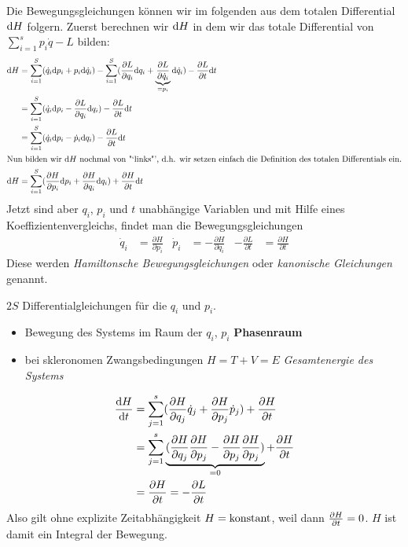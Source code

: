 Die Bewegungsgleichungen können wir im folgenden aus dem totalen Differential $\mathrm d H$ folgern.
Zuerst berechnen wir $\mathrm d H$ in dem wir das totale Differential von $\sum_{i=1}^s p_i \dot{q} - L$ bilden:
\begin{align*}
\mathrm d H &= \sum\limits_{i=1}^S (\dot q_i \mathrm d p_i + p_i \mathrm d \dot q_i) - \sum\limits_{i=1}^S (\frac{\partial L}{\partial q_i} \mathrm d q_i + \underbrace{\frac{\partial L}{\partial \dot q_i}}_{=p_i} \mathrm d \dot q_i) - \frac{\partial L}{\partial t} \mathrm d t\\
&=\sum\limits_{i=1}^S(\dot q_i \mathrm d p_i - \frac{\partial L}{\partial q_i}\mathrm d q_i) - \frac{\partial L}{\partial t}\mathrm d t\\
&=\sum\limits_{i=1}^S(\dot q_i \mathrm d p_i - \dot p_i\mathrm d q_i) - \frac{\partial L}{\partial t}\mathrm d t\\
\intertext{Nun bilden wir $\mathrm d H$ nochmal von "`links"', d.h. wir setzen einfach die Definition des totalen Differentials ein.}
\mathrm d H &= \sum\limits_{i=1}^S(\frac{\partial H}{\partial p_i}\mathrm d p_i + \frac{\partial H}{\partial q_i}\mathrm d q_i) + \frac{\partial H}{\partial t}\mathrm d t\\
\end{align*}
Jetzt sind aber $q_i$, $p_i$ und $t$ unabhängige Variablen und mit Hilfe eines Koeffizientenvergleichs, findet man die Bewegungsgleichungen
\begin{align*}
\dot q_i &= \frac{\partial H}{\partial p_i} & \dot p_i &= - \frac{\partial H}{\partial q_i} & -\frac{\partial L}{\partial t} &= \frac{\partial H}{\partial t}
\end{align*}
Diese werden \emph{Hamiltonsche Bewegungsgleichungen} oder \emph{kanonische Gleichungen} genannt.

\begin{bemerkung*}
	$2S$ Differentialgleichungen für die $q_i$ und $p_i$.
	\begin{itemize}
		\item Bewegung des Systems im Raum der $q_i$, $p_i$ \conseq \textbf{Phasenraum}
		\item bei skleronomen Zwangsbedingungen $H = T + V = E$ \textit{Gesamtenergie des Systems}
	\end{itemize}
\end{bemerkung*}
\begin{align*}
	\frac{\mathrm d H}{\mathrm d t} &= \sum_{j=1}^{s} (\frac{\partial H}{\partial q_j} \dot{q}_j + \frac{\partial H}{\partial p_j} \dot{p}_j) + \frac{\partial H}{\partial t}\\
	&= \sum_{j=1}^{s} \underbrace{(\frac{\partial H}{\partial q_j} \frac{\partial H}{\partial p_j} - \frac{\partial H}{\partial p_j} \frac{\partial H}{\partial p_j})}_{=0}+ \frac{\partial H}{\partial t}\\
	&= \frac{\partial H}{\partial t} = - \frac{\partial L}{\partial t}
\end{align*} 
Also gilt ohne explizite Zeitabhängigkeit $H = \text{konstant}$, weil dann $\frac{\partial H}{\partial t} = 0$. $H$ ist damit ein Integral der Bewegung.

